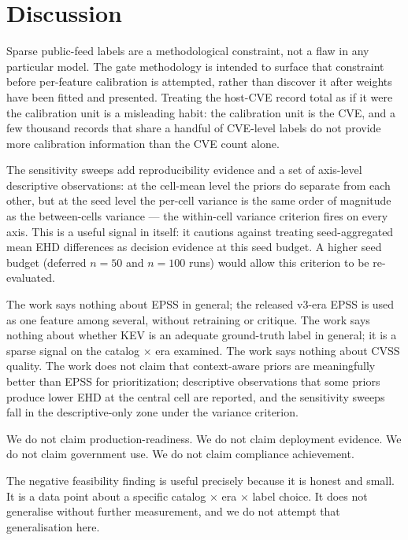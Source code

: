 \section{Discussion}
Sparse public-feed labels are a methodological constraint, not a flaw in any particular model. The gate methodology is intended to surface that constraint before per-feature calibration is attempted, rather than discover it after weights have been fitted and presented. Treating the host-CVE record total as if it were the calibration unit is a misleading habit: the calibration unit is the CVE, and a few thousand records that share a handful of CVE-level labels do not provide more calibration information than the CVE count alone.

The sensitivity sweeps add reproducibility evidence and a set of axis-level descriptive observations: at the cell-mean level the priors do separate from each other, but at the seed level the per-cell variance is the same order of magnitude as the between-cells variance — the within-cell variance criterion fires on every axis. This is a useful signal in itself: it cautions against treating seed-aggregated mean EHD differences as decision evidence at this seed budget. A higher seed budget (deferred $n = 50$ and $n = 100$ runs) would allow this criterion to be re-evaluated.

The work says nothing about EPSS in general; the released v3-era EPSS is used as one feature among several, without retraining or critique. The work says nothing about whether KEV is an adequate ground-truth label in general; it is a sparse signal on the catalog $\times$ era examined. The work says nothing about CVSS quality. The work does not claim that context-aware priors are meaningfully better than EPSS for prioritization; descriptive observations that some priors produce lower EHD at the central cell are reported, and the sensitivity sweeps fall in the descriptive-only zone under the variance criterion.

We do not claim production-readiness. We do not claim deployment evidence. We do not claim government use. We do not claim compliance achievement.

The negative feasibility finding is useful precisely because it is honest and small. It is a data point about a specific catalog × era × label choice. It does not generalise without further measurement, and we do not attempt that generalisation here.
